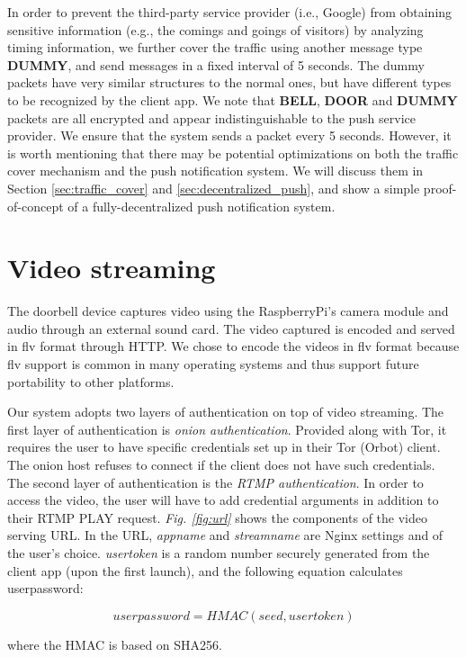 In order to prevent the third-party service provider (i.e., Google) from obtaining sensitive information (e.g., the comings and goings of visitors) by analyzing timing information, we further cover the traffic using another message type \textbf{DUMMY}, and send messages in a fixed interval of 5 seconds. The dummy packets have very similar structures to the normal ones, but have different types to be recognized by the client app. We note that \textbf{BELL}, \textbf{DOOR} and \textbf{DUMMY} packets are all encrypted and appear indistinguishable to the push service provider. We ensure that the system sends a packet every 5 seconds. However, it is worth mentioning that there may be potential optimizations on both the traffic cover mechanism and the push notification system. We will discuss them in Section \ref{sec:traffic_cover} and \ref{sec:decentralized_push}, and show a simple proof-of-concept of a fully-decentralized push notification system.




\section{Video streaming}
The doorbell device captures video using the RaspberryPi's camera module and audio through an external sound card. The video captured is encoded and served in flv format through HTTP. We chose to encode the videos in flv format because flv support is common in many operating systems and thus support future portability to other platforms.

Our system adopts two layers of authentication on top of video streaming. The first layer of authentication is \textit{onion authentication}. Provided along with Tor, it requires the user to have specific credentials set up in their Tor (Orbot) client. The onion host refuses to connect if the client does not have such credentials. The second layer of authentication is the \textit{RTMP authentication}. In order to access the video, the user will have to add credential arguments in addition to their RTMP PLAY request. \textit{Fig. \ref{fig:url}} shows the components of the video serving URL. In the URL, \textit{appname} and \textit{streamname} are Nginx settings and of the user's choice. \textit{usertoken} is a random number securely generated from the client app (upon the first launch), and the following equation calculates userpassword:

\[
userpassword = HMAC(seed, usertoken)
\]

where the HMAC is based on SHA256.

